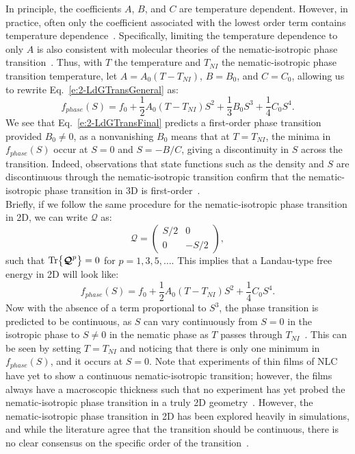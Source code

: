 In principle, the coefficients $A$, $B$, and $C$ are temperature dependent.
However, in practice, often only the coefficient associated with the lowest order term contains temperature dependence~\cite{RN33,RN175}.
Specifically, limiting the temperature dependence to only $A$ is also consistent with molecular theories of the nematic-isotropic phase transition~\cite{RN33}.
Thus, with $T$ the temperature and $T_{NI}$ the nematic-isotropic phase transition temperature, let $A = A_0(T-T_{NI})$, $B = B_0$, and $C = C_0$, allowing us to rewrite Eq.~\ref{e:2-LdGTransGeneral} as:
\begin{equation}
  f_{phase}(S) = f_0 + \frac{1}{2}A_0(T-T_{NI}) S^2 + \frac{1}{3}B_0 S^3 + \frac{1}{4}C_0 S^4.\label{e:2-LdGTransFinal}
\end{equation}
We see that Eq.~\ref{e:2-LdGTransFinal} predicts a first-order phase transition provided $B_0 \neq  0$, as a nonvanishing $B_0$ means that at $T = T_{NI}$, the minima in $f_{phase}(S)$ occur at $S = 0$ and $S = -B/C$, giving a discontinuity in $S$ across the transition.
Indeed, observations that state functions such as the density and $S$ are discontinuous through the nematic-isotropic transition confirm that the nematic-isotropic phase transition in 3D is first-order~\cite{RN33}. \\

Briefly, if we follow the same procedure for the nematic-isotropic phase transition in 2D, we can write $\bm{\mathcal{Q}}$ as:
\begin{equation}
  \bm{\mathcal{Q}} =
  \begin{pmatrix}
    S/2 & 0 \\
    0 & -S/2
  \end{pmatrix},
\end{equation}
such that $\textup{Tr} \big \{ \bm{\mathcal{Q}}^p \big \} = 0$ for $p = 1,3,5,\dots$.
This implies that a Landau-type free energy in 2D will look like:
\begin{equation}
  f_{phase}(S) = f_0 + \frac{1}{2}A_0(T-T_{NI}) S^2 + \frac{1}{4}C_0 S^4.
\end{equation}
Now with the absence of a term proportional to $S^3$, the phase transition is predicted to be continuous, as $S$ can vary continuously from $S=0$ in the isotropic phase to $S \neq 0$ in the nematic phase as $T$ passes through $T_{NI}$~\cite{RN33}.
This can be seen by setting $T = T_{NI}$ and noticing that there is only one minimum in $f_{phase}(S)$, and it occurs at $S=0$.
Note that experiments of thin films of NLC have yet to show a continuous nematic-isotropic transition; however, the films always have a macroscopic thickness such that no experiment has yet probed the nematic-isotropic phase transition in a truly 2D geometry~\cite{RN231}.
However, the nematic-isotropic phase transition in 2D has been explored heavily in simulations, and while the literature agree that the transition should be continuous, there is no clear consensus on the specific order of the transition~\cite{RN172}.



